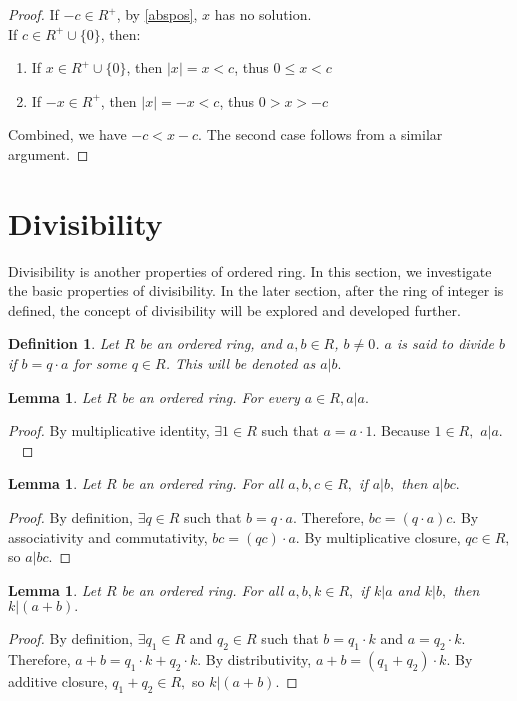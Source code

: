 \documentclass{article}
\newtheorem{defn}[thm]{Definition}
\newtheorem{lem}[thm]{Lemma}
\begin{document}
\begin{proof}
If $-c\in R^+$, by \ref{abspos}, $x$ has no solution.\\
If $c\in R^{+}\cup \{0\}$, then:
\begin{enumerate}
    \item If $x\in R^{+} \cup \{0\}$, then $|x|=x<c$, thus $0\leq x <c$
    \item If $-x\in R^+$, then $|x|=-x<c$, thus $0>x>-c$
\end{enumerate}
Combined, we have $-c<x-c$. The second case follows from a similar argument. 
\end{proof}





\section{Divisibility}
Divisibility is another properties of ordered ring. In this section, we investigate the basic properties of divisibility. In the later section, after the ring of integer is defined, the concept of divisibility will be explored and developed further.
\begin{defn}
\label{div}
Let $R$ be an ordered ring, and $a,b\in R$, $b\neq 0$. $a$ is said to divide $b$ if $b = q\cdot a$ for some $q\in R$. This will be denoted as $a|b.$
\end{defn}

\begin{lem}
\label{1.6} Let $R$ be an ordered ring. For every $a \in R, a|a.$
\end{lem}
\begin{proof}
By multiplicative identity, $\exists 1\in R$ such that $a=a\cdot1.$ Because $1\in R,$ $a|a.$\
\end{proof}

\begin{lem}
\label{1.7} Let $R$ be an ordered ring. For all $a,b,c\in R,$ if $a|b,$ then $a|bc.$ 
\end{lem}
\begin{proof}
By definition, $\exists q\in R$ such that $b=q\cdot a.$ Therefore, $bc = (q\cdot a)c.$ By associativity and commutativity, $bc = (qc)\cdot a.$ By multiplicative closure, $qc\in R,$ so $a|bc.$
\end{proof}

\begin{lem}
\label{1.8} Let $R$ be an ordered ring. For all $a,b,k\in R,$ if $k|a$ and $k|b,$ then $k|(a+b).$
\end{lem}
\begin{proof}
By definition, $\exists q_{1}\in R$ and $q_{2}\in R$ such that $b=q_{1}\cdot k$ and $a=q_{2}\cdot k.$ Therefore, $a+b=q_{1}\cdot k + q_{2}\cdot k.$ By distributivity, $a+b = (q_{1} + q_{2})\cdot k.$ By additive closure, $q_{1} + q_{2}\in R,$ so $k|(a+b).$
\end{proof}
\end{document}
